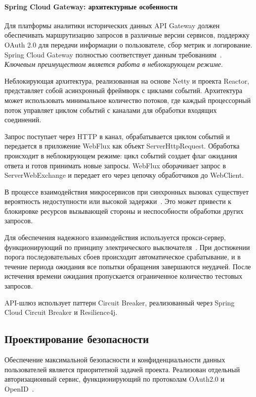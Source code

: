 \paragraph{Spring Cloud Gateway: архитектурные особенности}

Для платформы аналитики исторических данных API Gateway должен обеспечивать маршрутизацию запросов в различные версии сервисов, поддержку OAuth 2.0 для передачи информации о пользователе, сбор метрик и логирование.
Spring Cloud Gateway полностью соответствует данным требованиям~\cite{spring_cloud_gateway}. \textit{Ключевым преимуществом является работа в неблокирующем режиме}.

Неблокирующая архитектура, реализованная на основе Netty и проекта Reactor, представляет собой асинхронный фреймворк с циклами событий. Архитектура может использовать минимальное количество потоков, где каждый процессорный поток управляет циклом событий с каналами для обработки входящих соединений.

Запрос поступает через HTTP в канал, обрабатывается циклом событий и передается в приложение WebFlux как объект ServerHttpRequest. Обработка происходит в неблокирующем режиме: цикл событий создает флаг ожидания ответа и готов принимать новые запросы.
WebFlux оборачивает запрос в ServerWebExchange и передает его через цепочку обработчиков до WebClient.

В процессе взаимодействия микросервисов при синхронных вызовах существует вероятность недоступности или высокой задержки~\cite{richardson_circuit_breaker}. Это может привести к блокировке ресурсов вызывающей стороны и неспособности обработки других запросов.

Для обеспечения надежного взаимодействия используется прокси-сервер, функционирующий по принципу электрического выключателя~\cite{richardson2018microservices}. При достижении порога последовательных сбоев происходит автоматическое срабатывание, и в течение периода ожидания все попытки обращения завершаются неудачей.
После истечения времени ожидания пропускается ограниченное количество тестовых запросов.

API-шлюз использует паттерн Circuit Breaker, реализованный через Spring Cloud Circuit Breaker и Resilience4j.

\subsection{Проектирование безопасности}

Обеспечение максимальной безопасности и конфиденциальности данных пользователей является приоритетной задачей проекта.
Реализован отдельный авторизационный сервис, функционирующий по протоколам OAuth2.0 и OpenID~\cite{18_hardt2012,openid_foundation2014}.

